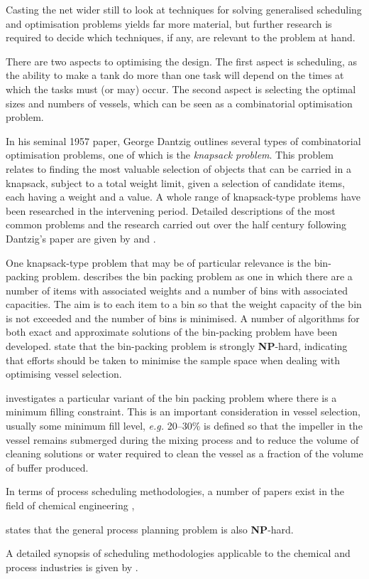 Casting the net wider still to look at techniques for solving generalised
scheduling and optimisation problems yields far more material, but further 
research is required to decide which techniques, if any, are relevant to the 
problem at hand.

There are two aspects to optimising the design.  The first aspect is scheduling,
as the ability to make a tank do more than one task will depend on the times
at which the tasks must (or may) occur.  The second aspect is selecting the
optimal sizes and numbers of vessels, which can be seen as a combinatorial
optimisation problem.

In his seminal 1957 paper, George Dantzig \nocite{Dantzig:1957} outlines several
types of combinatorial optimisation problems, one of which is the
\emph{knapsack problem}.  This problem relates to finding the most valuable
selection of objects that can be carried in a knapsack, subject to a total
weight limit, given a selection of candidate items, each having a weight and a 
value.
A whole range of knapsack-type problems have been researched in the intervening
period.  Detailed descriptions of the most common problems and the research 
carried out over the half century following Dantzig's paper are given by 
\citet{Korte:2012} and \citet{Martello:1990}.

One knapsack-type problem that may be of particular relevance is the bin-packing
problem.  \citet{Martello:1990} describes the bin packing problem as one in
which there are a number of items with associated weights and a number of bins
with associated capacities.  The aim is to each item to a bin so that the weight
capacity of the bin is not exceeded and the number of bins is minimised.
A number of algorithms for both exact and approximate solutions of the
bin-packing problem have been developed. \citet{Korte:2012} state that the
bin-packing problem is strongly \textbf{NP}-hard, indicating that efforts
should be taken to minimise the sample space when dealing with optimising vessel
selection.

\citet{Bettinelli:2010} investigates a particular variant of the bin packing
problem where there is a minimum filling constraint.  This is an important
consideration in vessel selection, usually some minimum fill level,
\textit{e.g.} 20--30\% is defined so that the impeller in the vessel remains
submerged during the mixing process and to reduce the volume of cleaning
solutions or water required to clean the vessel as a fraction of the volume of 
buffer produced.

In terms of process scheduling methodologies, a number of papers exist in the 
field of chemical engineering \citep{Ahmed:2000},

\citet{Ahmed:2000} states that the general process planning problem is also
\textbf{NP}-hard.

A detailed synopsis of scheduling methodologies applicable to the chemical 
and process industries is given by \citet{Harjunkoski:2014}.

